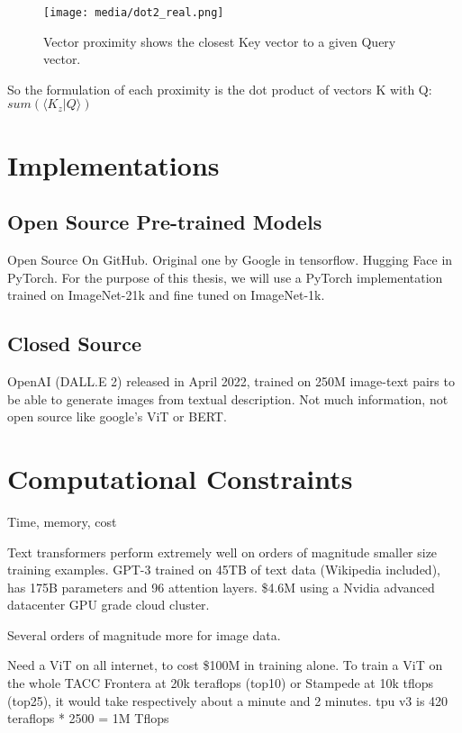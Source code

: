 \begin{figure}[H]
	\begin{center}
	\texttt{[image: media/dot2\_real.png]}
	\end{center}
	\caption[Key/Query Vector Proximity]{Vector proximity shows the closest Key vector to a given Query vector.}
	\end{figure}

So the formulation of each proximity is the dot product of vectors K with Q: $ \displaystyle sum(\langle K_z \vert Q \rangle) $


\section{Implementations}
\subsection{Open Source Pre-trained Models}

Open Source
On GitHub.
Original one by Google in tensorflow.
Hugging Face in PyTorch.
For the purpose of this thesis, we will use a PyTorch implementation trained on ImageNet-21k
and fine tuned on ImageNet-1k.

\subsection{Closed Source}

OpenAI (DALL.E 2) released in April 2022, trained on 250M image-text pairs 
to be able to generate images from textual description. \citep{Dalle2}
Not much information, not open source like google's ViT or BERT.

\section{Computational Constraints}

Time, memory, cost

Text transformers perform extremely well on orders of magnitude smaller size training examples.
GPT-3 trained on 45TB of text data (Wikipedia included), has 175B parameters and 96 attention layers. \citep{GPT3}
\$4.6M using a Nvidia advanced datacenter GPU grade cloud cluster.

Several orders of magnitude more for image data.

Need a ViT on all internet, to cost \$100M in training alone. 
To train a ViT on the whole TACC Frontera at 20k teraflops (top10) or 
Stampede at 10k tflops (top25), it would take respectively about a minute and 2 minutes.
tpu v3 is 420 teraflops * 2500 = 1M Tflops








